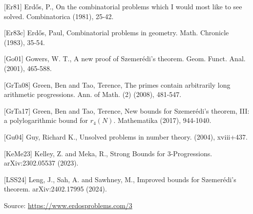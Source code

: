 \documentclass{article}
\begin{document}
 [Er81] Erd\H{o}s, P., On the combinatorial problems which I would most like to see solved. Combinatorica (1981), 25-42.
 
 [Er83c] Erd\H{o}s, Paul, Combinatorial problems in geometry. Math. Chronicle (1983), 35-54.
 
 [Go01] Gowers, W. T., A new proof of Szemer\'{e}di's theorem. Geom. Funct. Anal. (2001), 465-588.
 
 [GrTa08] Green, Ben and Tao, Terence, The primes contain arbitrarily long arithmetic progressions. Ann. of Math. (2) (2008), 481-547.
 
 [GrTa17] Green, Ben and Tao, Terence, New bounds for Szemer\'{e}di's theorem, III: a polylogarithmic bound for $r_4(N)$. Mathematika (2017), 944-1040.
 
 [Gu04] Guy, Richard K., Unsolved problems in number theory. (2004), xviii+437.
 
 [KeMe23] Kelley, Z. and Meka, R., Strong Bounds for 3-Progressions. arXiv:2302.05537 (2023).
 
 [LSS24] Leng, J., Sah, A. and Sawhney, M., Improved bounds for Szemer\'{e}di's theorem. arXiv:2402.17995 (2024).

\bigskip
\noindent\small{Source: \url{https://www.erdosproblems.com/3}}
\end{document}
